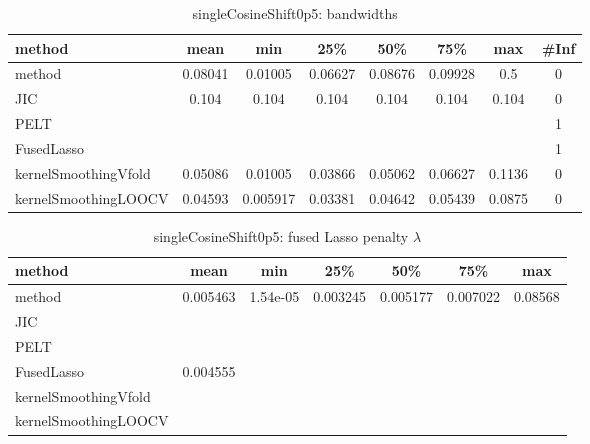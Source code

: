 \begin{table}[ht]
\centering
\begin{tabular}{l|c|ccccc|c}
  \hline
method & mean & min & 25\% & 50\% & 75\% & max & \#Inf \\ 
  \hline
method & 0.08041 & 0.01005 & 0.06627 & 0.08676 & 0.09928 &   0.5 &   0 \\ 
  JIC & 0.104 & 0.104 & 0.104 & 0.104 & 0.104 & 0.104 &   0 \\ 
  PELT &  &  &  &  &  &  &   1 \\ 
  FusedLasso &  &  &  &  &  &  &   1 \\ 
  kernelSmoothingVfold & 0.05086 & 0.01005 & 0.03866 & 0.05062 & 0.06627 & 0.1136 &   0 \\ 
  kernelSmoothingLOOCV & 0.04593 & 0.005917 & 0.03381 & 0.04642 & 0.05439 & 0.0875 &   0 \\ 
   \hline
\end{tabular}
\caption{singleCosineShift0p5: bandwidths} 
\label{tab:singleCosineShift0p5Bandwidths}
\end{table}
\begin{table}[ht]
\centering
\begin{tabular}{l|c|ccccc}
  \hline
method & mean & min & 25\% & 50\% & 75\% & max \\ 
  \hline
method & 0.005463 & 1.54e-05 & 0.003245 & 0.005177 & 0.007022 & 0.08568 \\ 
  JIC &  &  &  &  &  &  \\ 
  PELT &  &  &  &  &  &  \\ 
  FusedLasso & 0.004555 &  &  &  &  &  \\ 
  kernelSmoothingVfold &  &  &  &  &  &  \\ 
  kernelSmoothingLOOCV &  &  &  &  &  &  \\ 
   \hline
\end{tabular}
\caption{singleCosineShift0p5: fused Lasso penalty $\lambda$} 
\label{tab:singleCosineShift0p5Lambdas}
\end{table}
